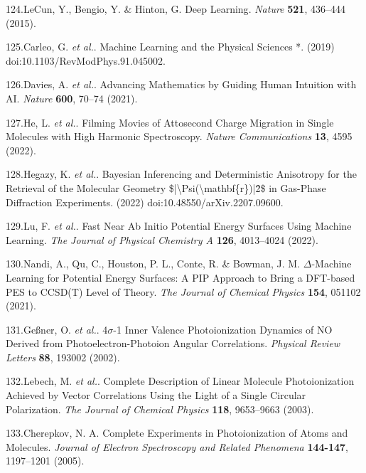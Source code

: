 \documentclass[10pt]{article}
\begin{document}
\label{csl:124}124.LeCun, Y., Bengio, Y. \& Hinton, G. {Deep Learning}. \textit{Nature} \textbf{521}, 436–444 (2015).

\label{csl:125}125.Carleo, G. \textit{et al.}. {Machine Learning and the Physical Sciences *}. (2019) doi:10.1103/RevModPhys.91.045002.

\label{csl:126}126.Davies, A. \textit{et al.}. {Advancing Mathematics by Guiding Human Intuition with {{AI}}}. \textit{Nature} \textbf{600}, 70–74 (2021).

\label{csl:127}127.He, L. \textit{et al.}. {Filming Movies of Attosecond Charge Migration in Single Molecules with High Harmonic Spectroscopy}. \textit{Nature Communications} \textbf{13}, 4595 (2022).

\label{csl:128}128.Hegazy, K. \textit{et al.}. {Bayesian Inferencing and Deterministic Anisotropy for the Retrieval of the Molecular Geometry \$|\textbackslash{{Psi}}(\textbackslash mathbf\{r\})|\^2\$ in Gas-Phase Diffraction Experiments}. (2022) doi:10.48550/arXiv.2207.09600.

\label{csl:129}129.Lu, F. \textit{et al.}. {Fast {{Near Ab Initio Potential Energy Surfaces Using Machine Learning}}}. \textit{The Journal of Physical Chemistry A} \textbf{126}, 4013–4024 (2022).

\label{csl:130}130.Nandi, A., Qu, C., Houston, P. L., Conte, R. \& Bowman, J. M. {{$\Delta$}-Machine Learning for Potential Energy Surfaces: {{A PIP}} Approach to Bring a {{DFT-based PES}} to {{CCSD}}({{T}}) Level of Theory}. \textit{The Journal of Chemical Physics} \textbf{154}, 051102 (2021).

\label{csl:131}131.Ge{\ss}ner, O. \textit{et al.}. {4{$\sigma$}-1 {{Inner Valence Photoionization Dynamics}} of {{NO Derived}} from {{Photoelectron}}-{{Photoion Angular Correlations}}}. \textit{Physical Review Letters} \textbf{88}, 193002 (2002).

\label{csl:132}132.Lebech, M. \textit{et al.}. {Complete Description of Linear Molecule Photoionization Achieved by Vector Correlations Using the Light of a Single Circular Polarization}. \textit{The Journal of Chemical Physics} \textbf{118}, 9653–9663 (2003).

\label{csl:133}133.Cherepkov, N. A. {Complete Experiments in Photoionization of Atoms and Molecules}. \textit{Journal of Electron Spectroscopy and Related Phenomena} \textbf{144-147}, 1197–1201 (2005).
\end{document}

